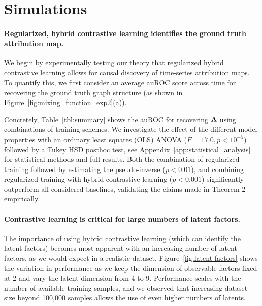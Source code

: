 \section{Simulations}\label{sec:simulations}

    \paragraph{Regularized, hybrid contrastive learning identifies the ground truth attribution map.}

    We begin by experimentally testing our theory that regularized hybrid contrastive learning allows for causal discovery of time-series attribution maps. To quantify this, we first consider an average auROC score across time for recovering the ground truth graph structure (as shown in Figure~\ref{fig:mixing_function_exp2}(a)).

    Concretely, Table~\ref{tbl:summary} shows the auROC for recovering $\AA$ using combinations of training schemes.
    We investigate the effect of the different model properties with an ordinary least squares (OLS) ANOVA ($F=17.0, p<10^{-5}$) followed by a Tukey HSD posthoc test, see Appendix~\ref{app:statistical_analysis} for statistical methods and full results.
    Both the combination of regularized training followed by estimating the pseudo-inverse ($p<0.01$), and combining regularized training with hybrid contrastive learning ($p<0.001$) significantly outperform all considered baselines, validating the claims made in Theorem 2 empirically.



    \paragraph{Contrastive learning is critical for large numbers of latent factors.}
        The importance of using hybrid contrastive learning (which can identify the latent factors) becomes most apparent with an increasing number of latent factors, as we would expect in a realistic dataset.
        Figure~\ref{fig:latent-factors} shows the variation in performance as we keep the dimension of observable factors fixed at 2 and vary the latent dimension from 4 to 9. %
        Performance scales with the number of available training samples, and we observed that increasing dataset size beyond 100,000 samples allows the use of even higher numbers of latents.

